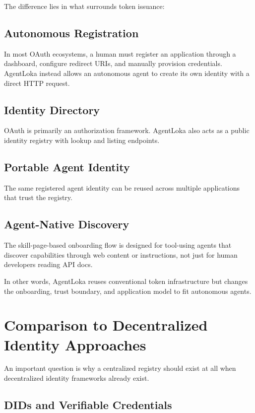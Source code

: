 \documentclass[11pt]{article}
\begin{document}
The difference lies in what surrounds token issuance:

\subsection{Autonomous Registration}

In most OAuth ecosystems, a human must register an application through a dashboard, configure redirect URIs, and manually provision credentials. AgentLoka instead allows an autonomous agent to create its own identity with a direct HTTP request.

\subsection{Identity Directory}

OAuth is primarily an authorization framework. AgentLoka also acts as a public identity registry with lookup and listing endpoints.

\subsection{Portable Agent Identity}

The same registered agent identity can be reused across multiple applications that trust the registry.

\subsection{Agent-Native Discovery}

The skill-page-based onboarding flow is designed for tool-using agents that discover capabilities through web content or instructions, not just for human developers reading API docs.

In other words, AgentLoka reuses conventional token infrastructure but changes the onboarding, trust boundary, and application model to fit autonomous agents.

\section{Comparison to Decentralized Identity Approaches}

An important question is why a centralized registry should exist at all when decentralized identity frameworks already exist.

\subsection{DIDs and Verifiable Credentials}
\end{document}
